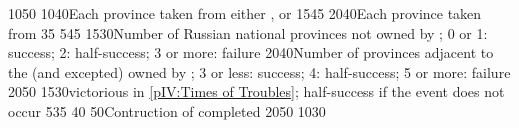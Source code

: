 %
%
%
{10}{50}{}%
%
%
%
{10}{40}{Each province taken from either \paysmajeurPologne,
  \paysmajeurLithuanie or \paysukraine}%
%
%
{15}{45}{}%
%
%
{20}{40}{Each province taken from \paysCrimee}%
%
%
{}{35}{}%
%
%
%
{5}{45}{}%
%
%
{15}{30}{Number of Russian national provinces not owned by \paysmajeurRussie;
  0 or 1: success; 2: half-success; 3 or more: failure}%
%
%
{20}{40}{Number of provinces adjacent to the \regionBaltique (\regionSuede and
  \regionFinlande excepted) owned by \paysmajeurSuede; 3 or less: success; 4:
  half-success; 5 or more: failure}%
%
%
%
{20}{50}{}%
%
%
{15}{30}{\RUS victorious in \ref{pIV:Times of Troubles}; half-success if the
  event does not occur}%
%
%
%
{5}{35}{}%
%
%
{}{40}{}%
%
%
{}{50}{Contruction of  completed}%
%
%
{20}{50}{}%
%
\EUobjective{}{\granderegionAmour/\granderegionBaikal}{\COL/\TP}%
{10}{30}{}%

